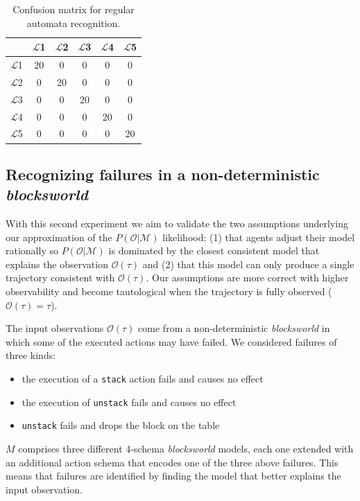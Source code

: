 \documentclass[letterpaper]{article} %
\begin{document}
\begin{table}
	\centering
	\begin{tabular}{c|c|c|c|c|c}
		& $\mathcal{L}$1 & $\mathcal{L}$2 & $\mathcal{L}$3 & $\mathcal{L}$4 & $\mathcal{L}$5\\ \hline
		$\mathcal{L}$1 & 20 & 0 & 0 & 0 & 0 \\
		$\mathcal{L}$2 & 0 & 20 & 0 & 0 & 0 \\
		$\mathcal{L}$3 & 0 & 0 & 20 & 0 & 0 \\
		$\mathcal{L}$4 & 0 & 0 & 0 & 20 & 0 \\
		$\mathcal{L}$5 & 0 & 0 & 0 & 0 & 20 \\
	\end{tabular}
	\caption{Confusion matrix for regular automata recognition.}
	\label{tab:conf_matrix}
\end{table}



\subsection{Recognizing failures in a non-deterministic {\em blocksworld}}
With this second experiment we aim to validate the two assumptions underlying our approximation of the $P(\mathcal{O}|\mathcal{M})$ likelihood: (1) that agents adjust their model rationally so $P(\mathcal{O}|\mathcal{M})$ is dominated by the closest consistent model that explains the observation $\mathcal{O}(\tau)$ and (2) that this model can only produce a single trajectory consistent with $\mathcal{O}(\tau)$. Our assumptions are more correct with higher observability and become tautological when the trajectory is fully observed ($\mathcal{O(\tau)} = \tau$).

The input observations $\mathcal{O}(\tau)$ come from a non-deterministic {\em blocksworld} in which some of the executed actions may have failed. We considered failures of three kinds:

\begin{itemize}
	\item the execution of a {\tt\small stack} action fails and causes no effect
	\item the execution of {\tt\small unstack} fails and causes no effect
	\item {\tt\small unstack} fails and drops the block on the table
\end{itemize}

$M$ comprises three different 4-schema {\em blocksworld} models, each one extended with an additional action schema that encodes one of the three above failures. This means that failures are identified by finding the model that better explains the input observation.
\end{document}
